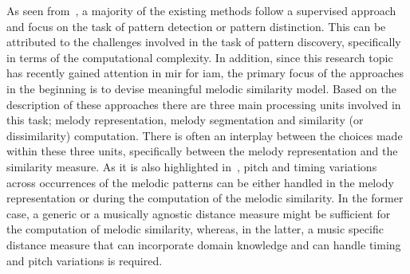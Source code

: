 As seen from~, a majority of the existing methods follow a supervised approach and focus on the task of pattern detection or pattern distinction. This can be attributed to the challenges involved in the task of pattern discovery, specifically in terms of the computational complexity. In addition, since this research topic has recently gained attention in \gls{mir} for \gls{iam}, the primary focus of the approaches in the beginning is to devise meaningful melodic similarity model. Based on the description of these approaches there are three main processing units involved in this task; melody representation, melody segmentation and similarity (or dissimilarity) computation. There is often an interplay between the choices made within these three units, specifically between the melody representation and the similarity measure. As it is also highlighted in~\cite{gomez2003melody}, pitch and timing variations across occurrences of the melodic patterns can be either handled in the melody representation or during the computation of the melodic similarity. In the former case, a generic or a musically agnostic distance measure might be sufficient for the computation of melodic similarity, whereas, in the latter, a music specific distance measure that can incorporate domain knowledge and can handle timing and pitch variations is required. 

